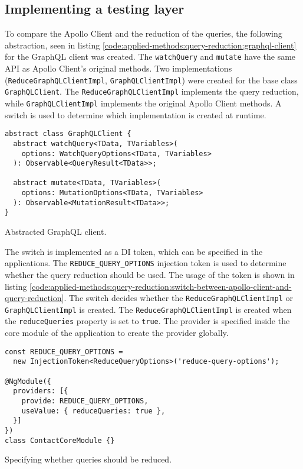 \subsection{Implementing a testing layer}\label{subsection:applied-methods:query-reduction:testing-query-reduction}

To compare the Apollo Client and the reduction of the queries, the following abstraction, seen in listing \ref{code:applied-methods:query-reduction:graphql-client} for the GraphQL client was created. The \texttt{watchQuery} and \texttt{mutate} have the same \ac{API} as Apollo Client's original methods. Two implementations (\texttt{ReduceGraphQLClientImpl}, \texttt{GraphQLClientImpl}) were created for the base class \texttt{GraphQLClient}. The \texttt{ReduceGraphQLClientImpl} implements the query reduction, while \texttt{GraphQLClientImpl} implements the original Apollo Client methods. A switch is used to determine which implementation is created at runtime.

\ifshowListings
\begin{listing}[H]
\begin{verbatim}
abstract class GraphQLClient {
  abstract watchQuery<TData, TVariables>(
    options: WatchQueryOptions<TData, TVariables>
  ): Observable<QueryResult<TData>>;

  abstract mutate<TData, TVariables>(
    options: MutationOptions<TData, TVariables>
  ): Observable<MutationResult<TData>>;
}
\end{verbatim}
\caption{Abstracted GraphQL client.}\label{code:applied-methods:query-reduction:graphql-client}
\end{listing}
\fi

\noindent The switch is implemented as a \ac{DI} token, which can be specified in the applications. The \texttt{REDUCE\_QUERY\_OPTIONS} injection token is used to determine whether the query reduction should be used. The usage of the token is shown in listing \ref{code:applied-methods:query-reduction:switch-between-apollo-client-and-query-reduction}. The switch decides whether the \texttt{ReduceGraphQLClientImpl} or \texttt{GraphQLClientImpl} is created. The \texttt{ReduceGraphQLClientImpl} is created when the \texttt{reduceQueries} property is set to \texttt{true}. The provider is specified inside the core module of the application to create the provider globally.

\ifshowListings
\begin{listing}[H]
\begin{verbatim}
const REDUCE_QUERY_OPTIONS = 
  new InjectionToken<ReduceQueryOptions>('reduce-query-options');

@NgModule({
  providers: [{
    provide: REDUCE_QUERY_OPTIONS,
    useValue: { reduceQueries: true },
  }]
})
class ContactCoreModule {}
\end{verbatim}
\caption{Specifying whether queries should be reduced.}\label{code:applied-methods:query-reduction:switch-between-apollo-client-and-query-reduction}
\end{listing}
\fi

